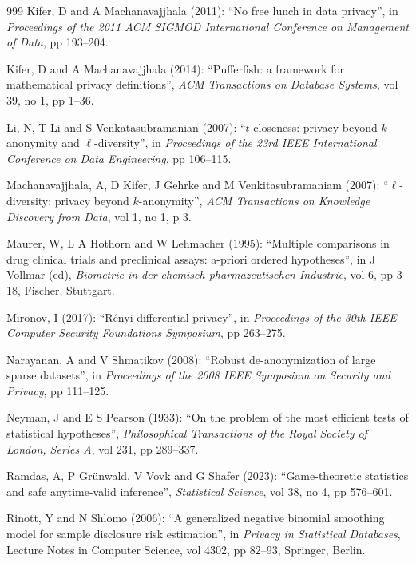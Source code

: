 \begin{thebibliography}{999}
Kifer, D and A Machanavajjhala (2011): ``No free lunch in data privacy'', in \emph{Proceedings of the 2011 ACM SIGMOD International Conference on Management of Data}, pp 193--204.

Kifer, D and A Machanavajjhala (2014): ``Pufferfish: a framework for mathematical privacy definitions'', \emph{ACM Transactions on Database Systems}, vol 39, no 1, pp 1--36.

Li, N, T Li and S Venkatasubramanian (2007): ``$t$-closeness: privacy beyond $k$-anonymity and $\ell$-diversity'', in \emph{Proceedings of the 23rd IEEE International Conference on Data Engineering}, pp 106--115.

Machanavajjhala, A, D Kifer, J Gehrke and M Venkitasubramaniam (2007): ``$\ell$-diversity: privacy beyond $k$-anonymity'', \emph{ACM Transactions on Knowledge Discovery from Data}, vol 1, no 1, p 3.

Maurer, W, L A Hothorn and W Lehmacher (1995): ``Multiple comparisons in drug clinical trials and preclinical assays: a-priori ordered hypotheses'', in J Vollmar (ed), \emph{Biometrie in der chemisch-pharmazeutischen Industrie}, vol 6, pp 3--18, Fischer, Stuttgart.

Mironov, I (2017): ``R\'enyi differential privacy'', in \emph{Proceedings of the 30th IEEE Computer Security Foundations Symposium}, pp 263--275.

Narayanan, A and V Shmatikov (2008): ``Robust de-anonymization of large sparse datasets'', in \emph{Proceedings of the 2008 IEEE Symposium on Security and Privacy}, pp 111--125.

Neyman, J and E S Pearson (1933): ``On the problem of the most efficient tests of statistical hypotheses'', \emph{Philosophical Transactions of the Royal Society of London, Series A}, vol 231, pp 289--337.

Ramdas, A, P Gr\"unwald, V Vovk and G Shafer (2023): ``Game-theoretic statistics and safe anytime-valid inference'', \emph{Statistical Science}, vol 38, no 4, pp 576--601.

Rinott, Y and N Shlomo (2006): ``A generalized negative binomial smoothing model for sample disclosure risk estimation'', in \emph{Privacy in Statistical Databases}, Lecture Notes in Computer Science, vol 4302, pp 82--93, Springer, Berlin.


\end{thebibliography}
